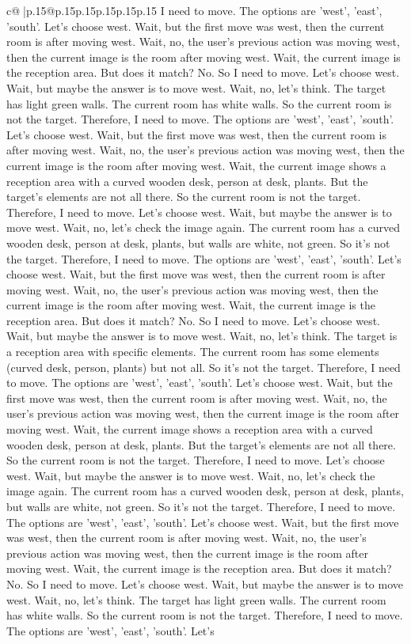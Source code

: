 \documentclass{article}
\begin{document}
{\begin{supertabular}{c@{$\;$}|p{.15\linewidth}@{}p{.15\linewidth}p{.15\linewidth}p{.15\linewidth}p{.15\linewidth}p{.15\linewidth}}
{{{I need to move. The options are 'west', 'east', 'south'. Let's choose west. Wait, but the first move was west, then the current room is after moving west. Wait, no, the user's previous action was moving west, then the current image is the room after moving west. Wait, the current image is the reception area. But does it match? No. So I need to move. Let's choose west. Wait, but maybe the answer is to move west. Wait, no, let's think. The target has light green walls. The current room has white walls. So the current room is not the target. Therefore, I need to move. The options are 'west', 'east', 'south'. Let's choose west. Wait, but the first move was west, then the current room is after moving west. Wait, no, the user's previous action was moving west, then the current image is the room after moving west. Wait, the current image shows a reception area with a curved wooden desk, person at desk, plants. But the target's elements are not all there. So the current room is not the target. Therefore, I need to move. Let's choose west. Wait, but maybe the answer is to move west. Wait, no, let's check the image again. The current room has a curved wooden desk, person at desk, plants, but walls are white, not green. So it's not the target. Therefore, I need to move. The options are 'west', 'east', 'south'. Let's choose west. Wait, but the first move was west, then the current room is after moving west. Wait, no, the user's previous action was moving west, then the current image is the room after moving west. Wait, the current image is the reception area. But does it match? No. So I need to move. Let's choose west. Wait, but maybe the answer is to move west. Wait, no, let's think. The target is a reception area with specific elements. The current room has some elements (curved desk, person, plants) but not all. So it's not the target. Therefore, I need to move. The options are 'west', 'east', 'south'. Let's choose west. Wait, but the first move was west, then the current room is after moving west. Wait, no, the user's previous action was moving west, then the current image is the room after moving west. Wait, the current image shows a reception area with a curved wooden desk, person at desk, plants. But the target's elements are not all there. So the current room is not the target. Therefore, I need to move. Let's choose west. Wait, but maybe the answer is to move west. Wait, no, let's check the image again. The current room has a curved wooden desk, person at desk, plants, but walls are white, not green. So it's not the target. Therefore, I need to move. The options are 'west', 'east', 'south'. Let's choose west. Wait, but the first move was west, then the current room is after moving west. Wait, no, the user's previous action was moving west, then the current image is the room after moving west. Wait, the current image is the reception area. But does it match? No. So I need to move. Let's choose west. Wait, but maybe the answer is to move west. Wait, no, let's think. The target has light green walls. The current room has white walls. So the current room is not the target. Therefore, I need to move. The options are 'west', 'east', 'south'. Let's }}}
\end{supertabular}}
\end{document}

